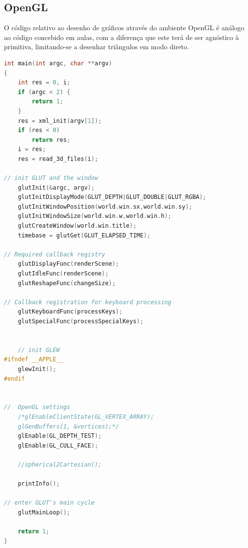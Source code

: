 \documentclass[14pt, a4 paper]{article}
\begin{document}
\subsection{OpenGL}

O código relativo ao desenho de gráficos atrav\'es do ambiente OpenGL \'e análogo ao código concebido em
aulas, com a diferença que este terá de ser agnóstico à primitiva, limitando-se a desenhar triângulos
em modo direto.
\begin{lstlisting}[language = c++]
int main(int argc, char **argv)
{
	int res = 0, i;
	if (argc < 2) {
		return 1;
	}
	res = xml_init(argv[1]);
	if (res < 0)
		return res;
	i = res;
	res = read_3d_files(i);

// init GLUT and the window
	glutInit(&argc, argv);
	glutInitDisplayMode(GLUT_DEPTH|GLUT_DOUBLE|GLUT_RGBA);
	glutInitWindowPosition(world.win.sx,world.win.sy);
	glutInitWindowSize(world.win.w,world.win.h);
	glutCreateWindow(world.win.title);
	timebase = glutGet(GLUT_ELAPSED_TIME);
		
// Required callback registry 
	glutDisplayFunc(renderScene);
	glutIdleFunc(renderScene);
	glutReshapeFunc(changeSize);
	
// Callback registration for keyboard processing
	glutKeyboardFunc(processKeys);
	glutSpecialFunc(processSpecialKeys);


	// init GLEW
#ifndef __APPLE__
	glewInit();
#endif


//  OpenGL settings
	/*glEnableClientState(GL_VERTEX_ARRAY);
	glGenBuffers(1, &vertices);*/
	glEnable(GL_DEPTH_TEST);
	glEnable(GL_CULL_FACE);

	//spherical2Cartesian();

	printInfo();

// enter GLUT's main cycle
	glutMainLoop();
	
	return 1;
}
\end{lstlisting}
\end{document}
